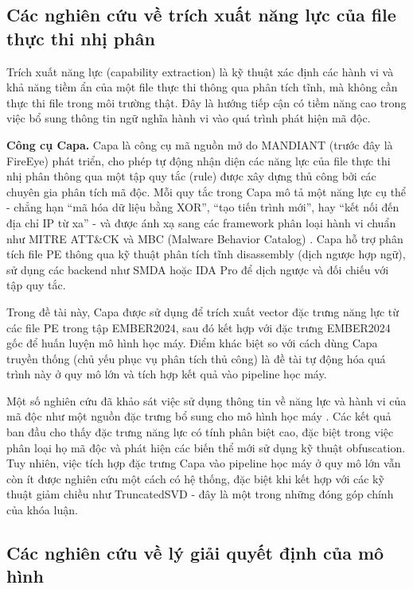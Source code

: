 \subsection{Các nghiên cứu về trích xuất năng lực của file thực thi nhị phân}

Trích xuất năng lực (capability extraction) là kỹ thuật xác định các
hành vi và khả năng tiềm ẩn của một file thực thi thông qua phân tích
tĩnh, mà không cần thực thi file trong môi trường thật. Đây là hướng
tiếp cận có tiềm năng cao trong việc bổ sung thông tin ngữ nghĩa hành
vi vào quá trình phát hiện mã độc.

\textbf{Công cụ Capa.}
Capa \cite{capa} là công cụ mã nguồn mở do MANDIANT (trước đây là
FireEye) phát triển, cho phép tự động nhận diện các năng lực của file
thực thi nhị phân thông qua một tập quy tắc (rule) được xây dựng thủ
công bởi các chuyên gia phân tích mã độc. Mỗi quy tắc trong Capa mô
tả một năng lực cụ thể - chẳng hạn ``mã hóa dữ liệu bằng XOR'',
``tạo tiến trình mới'', hay ``kết nối đến địa chỉ IP từ xa'' - và
được ánh xạ sang các framework phân loại hành vi chuẩn như MITRE
ATT\&CK \cite{attack} và MBC (Malware Behavior Catalog) \cite{mbc}.
Capa hỗ trợ phân tích file PE thông qua kỹ thuật phân tích tĩnh 
disassembly (dịch ngược hợp ngữ), sử dụng các backend như SMDA
hoặc IDA Pro để dịch ngược và đối chiếu với tập quy tắc.
 
Trong đề tài này, Capa được sử dụng để trích xuất vector đặc trưng
năng lực từ các file PE trong tập EMBER2024, sau đó kết hợp với đặc
trưng EMBER2024 gốc để huấn luyện mô hình học máy. Điểm khác biệt
so với cách dùng Capa truyền thống (chủ yếu phục vụ phân tích thủ
công) là đề tài tự động hóa quá trình này ở quy mô lớn và tích hợp
kết quả vào pipeline học máy.

Một số nghiên cứu đã khảo sát việc sử dụng thông tin về năng lực và
hành vi của mã độc như một nguồn đặc trưng bổ sung cho mô hình học
máy \cite{kim2022mapas,li2024malapi}. Các kết quả ban đầu cho thấy đặc trưng năng lực
có tính phân biệt cao, đặc biệt trong việc phân loại họ mã độc và
phát hiện các biến thể mới sử dụng kỹ thuật obfuscation. Tuy nhiên,
việc tích hợp đặc trưng Capa vào pipeline học máy ở quy mô lớn vẫn
còn ít được nghiên cứu một cách có hệ thống, đặc biệt khi kết hợp
với các kỹ thuật giảm chiều như TruncatedSVD - đây là một trong
những đóng góp chính của khóa luận.

\subsection{Các nghiên cứu về lý giải quyết định của mô hình}

